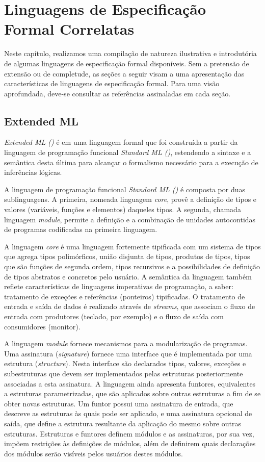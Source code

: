 \chapter{Linguagens de Especificação Formal Correlatas}
\label{chap:revisaobib}

Neste capítulo, realizamos uma compilação de natureza ilustrativa e introdutória de algumas linguagens de especificação formal disponíveis.
Sem a pretensão de extensão ou de completude, as seções a seguir visam a uma apresentação das características de linguagens de especificação formal.
Para uma visão aprofundada, deve-se consultar as referências assinaladas em cada seção.

\section{Extended ML}\label{chap:revisaobib:eml}
\textit{Extended ML (\EML)} \cite{MLDefIntro} é em uma linguagem formal que foi construída a partir da linguagem de programação funcional \textit{Standard ML (\SML)}, estendendo a sintaxe e a semântica desta última para alcançar o formalismo necessário para a execução de inferências lógicas.

A linguagem de programação funcional \textit{Standard ML (\SML)} é composta por duas sublinguagens.
A primeira, nomeada linguagem \textit{core}, provê a definição de tipos e valores (variáveis, funções e elementos) daqueles tipos.
A segunda, chamada linguagem \textit{module}, permite a definição e a combinação de unidades autocontidas de programas codificadas na primeira linguagem.

A linguagem \textit{core} é uma linguagem fortemente tipificada com um sistema de tipos que agrega tipos polimórficos, união disjunta de tipos, produtos de tipos, tipos que são funções de segunda ordem, tipos recursivos e a possibilidades de definição de tipos abstratos e concretos pelo usuário.
A semântica da linguagem também reflete características de linguagens imperativas de programação, a saber: tratamento de exceções e referências (ponteiros) tipificadas.
O tratamento de entrada e saída de dados é realizado através de \textit{streams}, que associam o fluxo de entrada com produtores (teclado, por exemplo) e o fluxo de saída com consumidores (monitor).

A linguagem \textit{module} fornece mecanismos para a modularização de programas.
Uma assinatura (\textit{signature}) fornece uma interface que é implementada por uma estrutura (\textit{structure}).
Nesta interface são declarados tipos, valores, exceções e subestruturas que devem ser implementados pelas estruturas posteriormente associadas a esta assinatura.
A linguagem ainda apresenta funtores, equivalentes a estruturas parametrizadas, que são aplicados sobre outras estruturas a fim de se obter novas estruturas.
Um funtor possui uma assinatura de entrada, que descreve as estruturas às quais pode ser aplicado, e uma assinatura opcional de saída, que define a estrutura resultante da aplicação do mesmo sobre outras estruturas.
Estruturas e funtores definem módulos e as assinaturas, por sua vez, impõem restrições às definições de módulos, além de definirem quais declarações dos módulos serão visíveis pelos usuários destes módulos.

